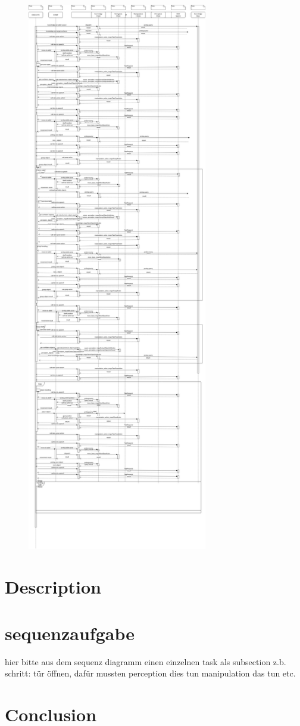 \documentclass[main.tex]{subfiles}
\begin{document}
		\begin{figure}	
			\centering
			\includegraphics[width=0.7\textwidth]{pictures/diagramms/grocery-sequence.png}
			\caption{}
			\label{fig:grocery-sequence}
		\end{figure}
	
	\section{Description}
	
	\section{sequenzaufgabe}
	hier bitte aus dem sequenz diagramm einen einzelnen task als subsection z.b. schritt: tür öffnen, dafür mussten perception dies tun manipulation das tun etc.
	
	\section{Conclusion}
	
	
	\endgroup
	
\end{document}
